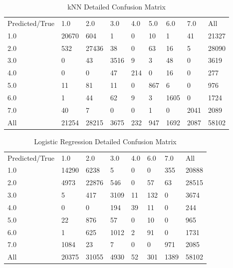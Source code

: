 \documentclass[12pt]{report}
\begin{document}
\begin{table}
\centering
\caption{kNN Detailed Confusion Matrix}
\label{my-label}
\begin{tabular}{lllllllll}
Predicted/True    &1.0    &2.0   &3.0 & 4.0  &5.0  & 6.0 &  7.0 &   All\\
1.0      &  20670  &  604  &   1  &  0  & 10    & 1  &  41 & 21327\\
2.0       &   532  &27436   & 38  &  0  & 63   & 16   &  5  &28090\\
3.0     &       0   &  43&  3516   & 9  &  3  &  48   &  0 &  3619\\
4.0     &       0    &  0  &  47&  214  &  0   & 16   &  0 &   277\\
5.0      &     11   &  81   & 11   & 0  &867   &  6  &   0   & 976\\
6.0      &      1   &  44  &  62  &  9  &  3 & 1605 &    0 &  1724\\
7.0        &   40    &  7   &  0   & 0  &  1    & 0  &2041 &  2089\\
All       & 21254  &28215 & 3675  &232&  947 & 1692 & 2087 &58102
\end{tabular}
\end{table}

\begin{table}
\centering
\caption{Logistic Regression Detailed Confusion Matrix}
\label{my-label}
\begin{tabular}{llllllll}
Predicted/True    &1.0    &2.0   &3.0 & 4.0  & 6.0 &  7.0 &   All\\
1.0        &14290   &6238    & 5  &  0  &  0  & 355 & 20888\\
2.0       &  4973 & 22876 &  546   & 0  & 57  &  63 & 28515\\
3.0           & 5    &417  &3109   &11  &132   &  0  & 3674\\
4.0           & 0   &   0  & 194  & 39  & 11 &    0  &  244\\
5.0          & 22    &876  &  57&    0  & 10   &  0   & 965\\
6.0            &1 &   625 &1012 &   2  & 91    & 0  & 1731\\
7.0         &1084   &  23    & 7   & 0   & 0  & 971   &2085\\
All        &20375&  31055 & 4930 &  52 & 301 & 1389  &58102
\end{tabular}
\end{table}
\end{document}

